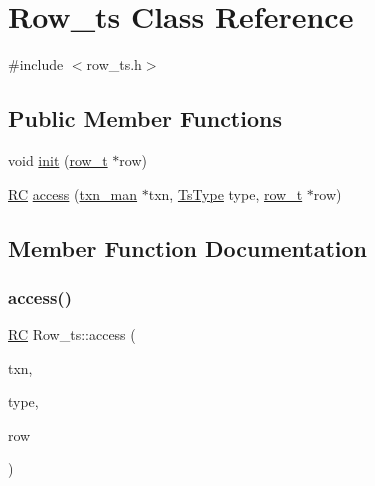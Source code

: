 \hypertarget{classRow__ts}{}\section{Row\+\_\+ts Class Reference}
\label{classRow__ts}


{\ttfamily \#include $<$row\+\_\+ts.\+h$>$}

\subsection*{Public Member Functions}
\begin{DoxyCompactItemize}
\item 
void \hyperlink{classRow__ts_a91b7d8834f613de5827b2f66e1f0efad}{init} (\hyperlink{classrow__t}{row\+\_\+t} $\ast$row)
\item 
\hyperlink{global_8h_a78c49a674c810fdd03d20432f7be864a}{RC} \hyperlink{classRow__ts_a0ceaa7aed6c2cdabc2885ecd9aa4852f}{access} (\hyperlink{classtxn__man}{txn\+\_\+man} $\ast$txn, \hyperlink{global_8h_a1a7f6ca1462293fe053b5ae74a6c4eda}{Ts\+Type} type, \hyperlink{classrow__t}{row\+\_\+t} $\ast$row)
\end{DoxyCompactItemize}


\subsection{Member Function Documentation}
\mbox{\label{classRow__ts_a0ceaa7aed6c2cdabc2885ecd9aa4852f}} 
\subsubsection{\texorpdfstring{access()}{access()}}
{\footnotesize\ttfamily \hyperlink{global_8h_a78c49a674c810fdd03d20432f7be864a}{RC} Row\+\_\+ts\+::access (\begin{DoxyParamCaption}\item[{\hyperlink{classtxn__man}{txn\+\_\+man} $\ast$}]{txn,  }\item[{\hyperlink{global_8h_a1a7f6ca1462293fe053b5ae74a6c4eda}{Ts\+Type}}]{type,  }\item[{\hyperlink{classrow__t}{row\+\_\+t} $\ast$}]{row }\end{DoxyParamCaption})}

\mbox{\label{classRow__ts_a91b7d8834f613de5827b2f66e1f0efad}} 
